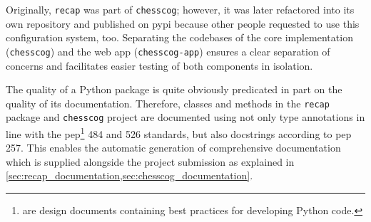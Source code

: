 \documentclass[../main.tex]{subfiles}
\begin{document}
Originally, \texttt{recap} was part of \texttt{chesscog}; however, it was later refactored into its own repository and published on \gls{pypi} because other people requested to use this configuration system, too.
Separating the codebases of the core implementation (\texttt{chesscog}) and the web app (\texttt{chesscog-app}) ensures a clear separation of concerns and facilitates easier testing of both components in isolation.

The quality of a Python package is quite obviously predicated in part on the quality of its documentation.
Therefore, classes and methods in the \texttt{recap} package and \texttt{chesscog} project are documented using not only type annotations in line with the \gls{pep}\footnote{ are design documents containing best practices for developing Python code.} 484 and 526 standards, but also docstrings according to \gls{pep} 257.
This enables the automatic generation of comprehensive documentation which is supplied alongside the project submission as explained in \cref{sec:recap_documentation,sec:chesscog_documentation}.
\end{document}
